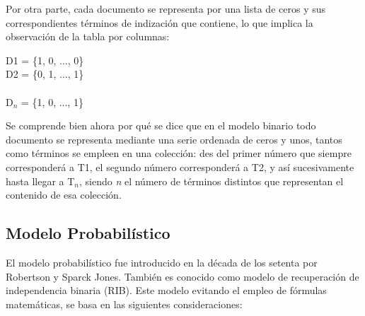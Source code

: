 \documentclass{article}
\begin{document}
Por otra parte, cada documento se representa por una lista de ceros y sus correspondientes términos de indización que contiene, lo que implica la observación de la tabla por columnas:

\begin{center}
	D1 = \{1, 0, ..., 0\} \\
	D2 = \{0, 1, ..., 1\} \\
	 \\
	D$_{n}$ = \{1, 0, ..., 1\} \\
\end{center}

Se comprende bien ahora por qué se dice que en el modelo binario todo documento se representa mediante una serie ordenada de ceros y unos, tantos como términos se empleen en una colección: des del primer número que siempre corresponderá a T1, el segundo número corresponderá a T2, y así sucesivamente hasta llegar a T$_{n}$, siendo \textit{n} el número de términos distintos que representan el contenido de esa colección.

\subsection{Modelo Probabilístico}

El modelo probabilístico fue introducido en la década de los setenta por Robertson y Sparck Jones. También es conocido como modelo de recuperación de independencia binaria (RIB). Este modelo evitando el empleo de fórmulas matemáticas, se basa en las siguientes consideraciones:
\end{document}
